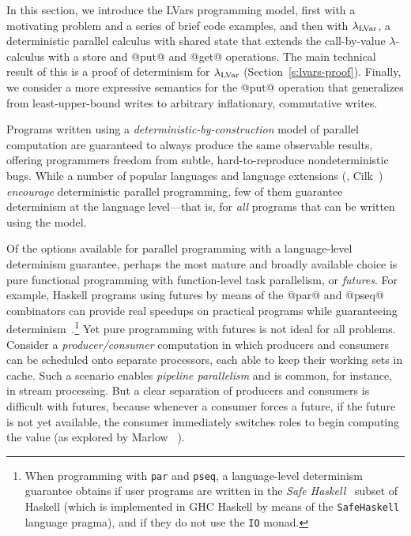\ifdefined\JOURNAL

In this section, we introduce the LVars programming model, first with
a motivating problem and a series of brief code examples, and then
with $\lambda_{\textrm{LVar}}$, a deterministic parallel calculus with shared
state that extends the call-by-value $\lambda$-calculus with a store
and @put@ and @get@ operations.  The main technical result of
this  is a proof of determinism for
$\lambda_{\textrm{LVar}}$ (Section~\ref{s:lvars-proof}).  Finally, we consider a
more expressive semantics for the @put@ operation that generalizes
from least-upper-bound writes to arbitrary inflationary, commutative
writes.

\fi

\ifdefined\DISSERTATION

Programs written using a \emph{deterministic-by-construction} model of
parallel computation are guaranteed to always produce the same
observable results, offering programmers freedom from subtle,
hard-to-reproduce nondeterministic bugs.  While a number of popular
languages and language extensions (\eg, Cilk~\cite{cilk}) \emph{encourage} deterministic parallel programming, few
of them guarantee determinism at the language level---that is, for
\emph{all} programs that can be written using the model.

Of the options available for parallel programming with a
language-level determinism guarantee, perhaps the most mature and
broadly available choice is pure functional programming with
function-level task parallelism, or \emph{futures}.  For example,
Haskell programs using futures by means of the @par@ and @pseq@
combinators can provide real speedups on practical programs while
guaranteeing determinism~\cite{marlow-par}.\footnote{When programming
  with \lstinline|par| and \lstinline|pseq|, a language-level
  determinism guarantee obtains if user programs are written in the
  \emph{Safe Haskell}~\cite{safe-haskell} subset of Haskell (which is
  implemented in GHC Haskell by means of the \lstinline|SafeHaskell|
  language pragma), and if they do not use the \lstinline|IO| monad.}
Yet pure programming with futures is not ideal for all problems.
Consider a \emph{producer/consumer} computation in which producers and
consumers can be scheduled onto separate processors, each able to keep
their working sets in cache.  Such a scenario enables \emph{pipeline
  parallelism} and is common, for instance, in stream processing.  But
a clear separation of producers and consumers is difficult with
futures, because whenever a consumer forces a future, if the future is
not yet available, the consumer immediately switches roles to begin
computing the value (as explored by Marlow \etal~\cite{monad-par}).


